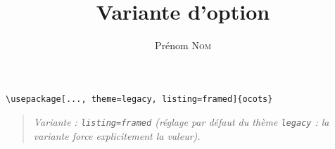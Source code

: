 \documentclass[11pt]{ocots-book}
\title{Variante d'option}
\author{Prénom \textsc{Nom}}
\newcommand{\ocotsvariantnote}[1]{\begin{quote}\itshape Variante : #1\end{quote}}
\begin{document}
\maketitle

\begin{lstlisting}
\usepackage[..., theme=legacy, listing=framed]{ocots}
\end{lstlisting}
\ocotsvariantnote{\texttt{listing=framed} (r\'eglage par d\'efaut du th\`eme \texttt{legacy} : la variante force explicitement la valeur).}

\end{document}
